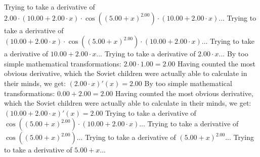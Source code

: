 \documentclass{article}
\begin{document}
\newline
Trying to take a derivative of ${{2.00} \cdot {\left({{10.00} + {{2.00} \cdot {x}}}\right) \cdot { \cos {\left({\left({{5.00} + {x}}\right) ^ {2.00}}\right)}  \cdot \left({{10.00} + {{2.00} \cdot {x}}}\right)}}}$...\newline
\newline
Trying to take a derivative of ${\left({{10.00} + {{2.00} \cdot {x}}}\right) \cdot { \cos {\left({\left({{5.00} + {x}}\right) ^ {2.00}}\right)}  \cdot \left({{10.00} + {{2.00} \cdot {x}}}\right)}}$...\newline
\newline
Trying to take a derivative of ${{10.00} + {{2.00} \cdot {x}}}$...\newline
\newline
Trying to take a derivative of ${{2.00} \cdot {x}}$...\newline
\newline
By too simple mathematical transformations:
 ${{2.00} \cdot {1.00}} = {2.00}$ 
 \newline
 \newline 
Having counted the most obvious derivative, which the Soviet children were actually able to calculate in their minds, we get:
$({{2.00} \cdot {x}})'(x) = {2.00}$\newline
\newline
By too simple mathematical transformations:
 ${{0.00} + {2.00}} = {2.00}$ 
 \newline
 \newline 
Having counted the most obvious derivative, which the Soviet children were actually able to calculate in their minds, we get:
$({{10.00} + {{2.00} \cdot {x}}})'(x) = {2.00}$\newline
\newline
Trying to take a derivative of ${ \cos {\left({\left({{5.00} + {x}}\right) ^ {2.00}}\right)}  \cdot \left({{10.00} + {{2.00} \cdot {x}}}\right)}$...\newline
\newline
Trying to take a derivative of $ \cos {\left({\left({{5.00} + {x}}\right) ^ {2.00}}\right)} $...\newline
\newline
Trying to take a derivative of ${\left({{5.00} + {x}}\right) ^ {2.00}}$...\newline
\newline
Trying to take a derivative of ${{5.00} + {x}}$...\newline
\newline
\end{document}
